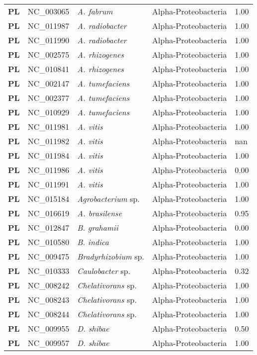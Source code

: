 \begin{adjustwidth}{-3cm}{2cm}
{\begin{supertabular}{>{\bfseries}l|p{0.1\textwidth}p{0.14\textwidth}l|l}
PL & NC\_003065 & \textit{A. fabrum} & Alpha-Proteobacteria & 1.00\\
PL & NC\_011987 & \textit{A. radiobacter} & Alpha-Proteobacteria & 1.00\\
PL & NC\_011990 & \textit{A. radiobacter} & Alpha-Proteobacteria & 1.00\\
PL & NC\_002575 & \textit{A. rhizogenes} & Alpha-Proteobacteria & 1.00\\
PL & NC\_010841 & \textit{A. rhizogenes} & Alpha-Proteobacteria & 1.00\\
PL & NC\_002147 & \textit{A. tumefaciens} & Alpha-Proteobacteria & 1.00\\
PL & NC\_002377 & \textit{A. tumefaciens} & Alpha-Proteobacteria & 1.00\\
PL & NC\_010929 & \textit{A. tumefaciens} & Alpha-Proteobacteria & 1.00\\
PL & NC\_011981 & \textit{A. vitis} & Alpha-Proteobacteria & 1.00\\
PL & NC\_011982 & \textit{A. vitis} & Alpha-Proteobacteria & nan\\
PL & NC\_011984 & \textit{A. vitis} & Alpha-Proteobacteria & 1.00\\
PL & NC\_011986 & \textit{A. vitis} & Alpha-Proteobacteria & 0.00\\
PL & NC\_011991 & \textit{A. vitis} & Alpha-Proteobacteria & 1.00\\
PL & NC\_015184 & \textit{Agrobacterium} sp. & Alpha-Proteobacteria & 1.00\\
PL & NC\_016619 & \textit{A. brasilense} & Alpha-Proteobacteria & 0.95\\
PL & NC\_012847 & \textit{B. grahamii} & Alpha-Proteobacteria & 0.00\\
PL & NC\_010580 & \textit{B. indica} & Alpha-Proteobacteria & 1.00\\
PL & NC\_009475 & \textit{Bradyrhizobium} sp. & Alpha-Proteobacteria & 1.00\\
PL & NC\_010333 & \textit{Caulobacter} sp. & Alpha-Proteobacteria & 0.32\\
PL & NC\_008242 & \textit{Chelativorans} sp. & Alpha-Proteobacteria & 1.00\\
PL & NC\_008243 & \textit{Chelativorans} sp. & Alpha-Proteobacteria & 1.00\\
PL & NC\_008244 & \textit{Chelativorans} sp. & Alpha-Proteobacteria & 1.00\\
PL & NC\_009955 & \textit{D. shibae} & Alpha-Proteobacteria & 0.50\\
PL & NC\_009957 & \textit{D. shibae} & Alpha-Proteobacteria & 1.00\\

\end{supertabular}}
\end{adjustwidth}
